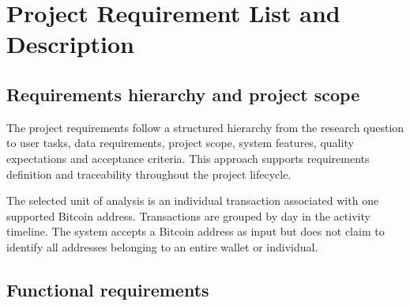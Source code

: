 \section{Project Requirement List and Description}
\label{sec:requirements}

\subsection{Requirements hierarchy and project scope}
\label{sec:hierarchy}

The project requirements follow a structured hierarchy from the research question to user tasks, data requirements, project scope, system features, quality expectations and acceptance criteria. This approach supports requirements definition and traceability throughout the project lifecycle.

The selected unit of analysis is an individual transaction associated with one supported Bitcoin address. Transactions are grouped by day in the activity timeline. The system accepts a Bitcoin address as input but does not claim to identify all addresses belonging to an entire wallet or individual.

\subsection{Functional requirements}
\label{sec:fr}

